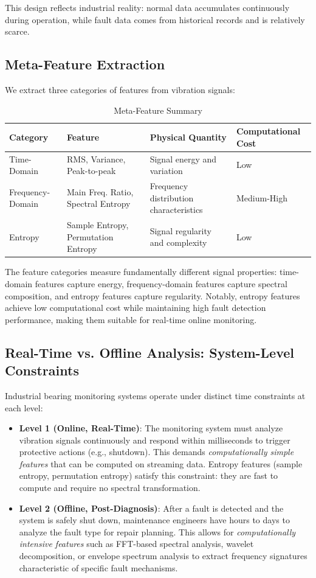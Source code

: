 \documentclass[11pt]{article}
\begin{document}
This design reflects industrial reality: normal data accumulates continuously during operation, while fault data comes from historical records and is relatively scarce.

\subsection{Meta-Feature Extraction}
We extract three categories of features from vibration signals:

\begin{table}[htbp]
\centering
\caption{Meta-Feature Summary}
\label{tab:features}
\begin{tabular}{|l|l|l|l|}
\toprule
Category & Feature & Physical Quantity & Computational Cost \\ \midrule
Time-Domain & RMS, Variance, Peak-to-peak & Signal energy and variation & Low \\ \midrule
Frequency-Domain & Main Freq. Ratio, Spectral Entropy & Frequency distribution characteristics & Medium-High \\ \midrule
Entropy & Sample Entropy, Permutation Entropy & Signal regularity and complexity & Low \\ \midrule
\bottomrule
\end{tabular}
\end{table}

The feature categories measure fundamentally different signal properties: time-domain features capture energy, frequency-domain features capture spectral composition, and entropy features capture regularity. Notably, entropy features achieve low computational cost while maintaining high fault detection performance, making them suitable for real-time online monitoring.

\subsection{Real-Time vs. Offline Analysis: System-Level Constraints}
Industrial bearing monitoring systems operate under distinct time constraints at each level:

\begin{itemize}
    \item \textbf{Level 1 (Online, Real-Time)}: The monitoring system must analyze vibration signals continuously and respond within milliseconds to trigger protective actions (e.g., shutdown). This demands \emph{computationally simple features} that can be computed on streaming data. Entropy features (sample entropy, permutation entropy) satisfy this constraint: they are fast to compute and require no spectral transformation.

    \item \textbf{Level 2 (Offline, Post-Diagnosis)}: After a fault is detected and the system is safely shut down, maintenance engineers have hours to days to analyze the fault type for repair planning. This allows for \emph{computationally intensive features} such as FFT-based spectral analysis, wavelet decomposition, or envelope spectrum analysis to extract frequency signatures characteristic of specific fault mechanisms.
\end{itemize}
\end{document}
